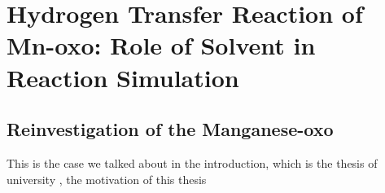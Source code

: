 
\chapter{Hydrogen Transfer Reaction of Mn-oxo: Role of Solvent in Reaction
Simulation\label{chpt:mnoxo}}

\section{Reinvestigation of the Manganese-oxo }

This is the case we talked about in the introduction, which is the
thesis of university , the motivation of this thesis
